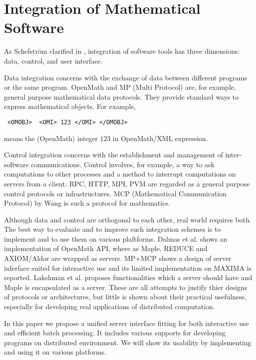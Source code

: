 
\section{Integration of Mathematical Software} 

As Schefstr\"om clarified in \cite{schefstrom},
integration of software tools has three dimensions:
data, control, and user interface.

Data integration concerns with the exchange of data between different
programs or the same program.
OpenMath \cite{OpenMath} and MP (Multi Protocol) \cite{GKW} are,
for example, general purpose mathematical data protocols.
They provide standard ways to express mathematical objects.
For example,
\begin{verbatim}
 <OMOBJ>  <OMI> 123 </OMI> </OMOBJ>
\end{verbatim}
means the (OpenMath) integer $123$ in OpenMath/XML expression.

Control integration concerns with the establishment and management of
inter-software communications.
Control involves, for example, a way to ask computations to other processes
and a method to interrupt computations on servers from a client.
RPC, HTTP, MPI, PVM are regarded as a general purpose control protocols or
infrastructures.
MCP (Mathematical Communication Protocol)
by Wang \cite{iamc} is such a protocol for mathematics.

Although data and control are orthogonal to each other, real world
requires both. The best way to evaluate and to improve such
integration schemes is to implement and to use them on various
plaftforms.  Dalmas et al. \cite{omimp} shows an implementation of
OpenMath API, where as Maple, REDUCE and
AXIOM/Aldor are wrapped as servers.  MP$+$MCP \cite{iamc} shows a design
of server inferface suited for interactive use and its limited
implementation on MAXIMA is reported.  Lakshman et al. \cite{pseware}
proposes functionalities which a server should have and Maple is
encapsulated as a server. These are all attempts to justify thier
designs of protocols or architectures, but little is shown about their
practical usefulness, especially for developing real applications of
distributed computation.

In this paper we propose a unified server interface fitting for both
interactive use and efficient batch processing. 
It includes various supports for developing programs on distributed 
environment. We will show its
usability by implementing and using it on various platforms.

